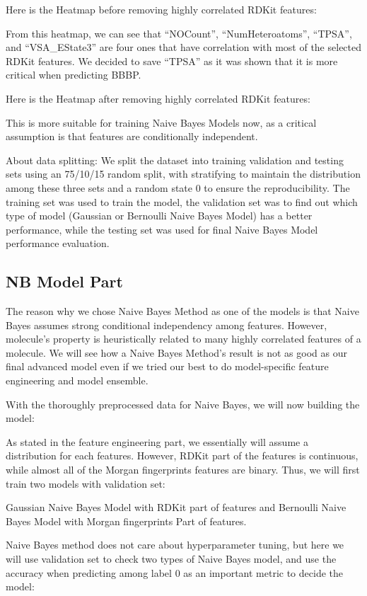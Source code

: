 \documentclass{article}
\begin{document}
Here is the Heatmap before removing highly correlated RDKit features:

From this heatmap, we can see that “NOCount”, “NumHeteroatoms”, “TPSA”, and “VSA\_EState3” are four ones that have correlation with most of the selected RDKit features. We decided to save “TPSA” as it was shown that it is more critical when predicting BBBP.

Here is the Heatmap after removing highly correlated RDKit features:

This is more suitable for training Naive Bayes Models now, as a critical assumption is that features are conditionally independent.

About data splitting: We split the dataset into training validation and testing sets using an 75/10/15 random split, with stratifying to maintain the distribution among these three sets and a random state 0 to ensure the reproducibility. The training set was used to train the model, the validation set was to find out which type of model (Gaussian or Bernoulli Naive Bayes Model) has a better performance, while the testing set was used for final Naive Bayes Model performance evaluation.

\subsection{NB Model Part}

The reason why we chose Naive Bayes Method as one of the models
is that Naive Bayes assumes strong conditional independency among
features. However, molecule's property is heuristically related to many
highly correlated features of a molecule. We will see how a Naive Bayes Method's result is not as good as our final advanced model even if we tried
our best to do model-specific feature engineering and model ensemble.

With the thoroughly preprocessed data for Naive Bayes, we will now building the model:

As stated in the feature engineering part, we essentially will assume a distribution for each features. However, RDKit part of the features is continuous, while almost all of the Morgan fingerprints features are binary. Thus, we will first train two models with validation set:

Gaussian Naive Bayes Model with RDKit part of features and Bernoulli Naive Bayes Model with Morgan fingerprints Part of features.

Naive Bayes method does not care about hyperparameter tuning, but here
we will use validation set to check two types of Naive Bayes model, and
use the accuracy when predicting among label 0 as an important metric
to decide the model:
\end{document}

